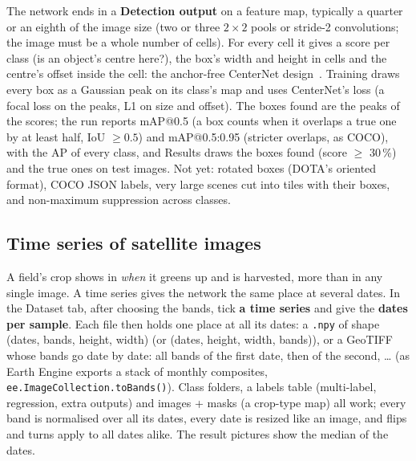 \documentclass[11pt,a4paper]{article}
\newcommand{\ui}[1]{\textbf{\textsf{#1}}}
\newcommand{\file}[1]{\texttt{#1}}
\begin{document}
The network ends in a \ui{Detection output} on a feature map, typically a quarter or an eighth of the image size (two or three
$2\times2$ pools or stride-2 convolutions; the image must be a whole number of cells). For every cell it gives a score per class (is an
object's centre here?), the box's width and height in cells and the centre's offset inside the cell: the anchor-free CenterNet
design~\cite{zhou2019centernet}. Training draws every box as a Gaussian peak on its class's map and uses CenterNet's loss (a focal
loss on the peaks, L1 on size and offset). The boxes found are the peaks of the scores; the run reports mAP@0.5 (a box counts when it
overlaps a true one by at least half, IoU $\ge 0.5$) and mAP@0.5:0.95 (stricter overlaps, as COCO), with the AP of every class, and Results
draws the boxes found (score $\ge$ 30\,\%) and the true ones on test images. Not yet: rotated boxes (DOTA's oriented format), COCO JSON
labels, very large scenes cut into tiles with their boxes, and non-maximum suppression across classes.

\subsection{Time series of satellite images}
\label{sec:timeseries}
A field's crop shows in \emph{when} it greens up and is harvested, more than in any single image. A time series gives the network the
same place at several dates. In the Dataset tab, after choosing the bands, tick \ui{a time series} and give the \ui{dates per sample}.
Each file then holds one place at all its dates: a \file{.npy} of shape (dates, bands, height, width) (or (dates, height, width, bands)),
or a GeoTIFF whose bands go date by date: all bands of the first date, then of the second, \dots{} (as Earth Engine exports a stack of
monthly composites, \texttt{ee.ImageCollection.toBands()}). Class folders, a labels table (multi-label, regression, extra outputs) and
images + masks (a crop-type map) all work; every band is normalised over all its dates, every date is resized like an image, and flips
and turns apply to all dates alike. The result pictures show the median of the dates.
\end{document}
